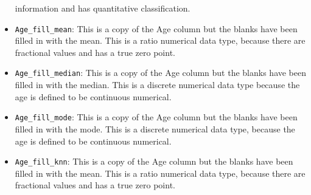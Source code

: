 \documentclass[a4paper, twocolumn]{article}
\begin{document}
\begin{itemize}
    information and has quantitative classification.
    \item \texttt{Age\_fill\_mean}: This is a copy of the Age column
    but the blanks have been filled in with the mean.
    This is a ratio numerical data type, because there are 
    fractional values and has a true zero point.
    \item \texttt{Age\_fill\_median}: This is a copy of the Age
    column but the blanks have been filled in with the median.
    This is a discrete numerical data type because the age is 
    defined to be continuous numerical.
    \item \texttt{Age\_fill\_mode}: This is a copy of the Age column
    but the blanks have been filled in with the mode.
    This is a discrete numerical data type, because the age is 
    defined to be continuous numerical.
    \item \texttt{Age\_fill\_knn}: This is a copy of the Age column
    but the blanks have been filled in with the mean.
    This is a ratio numerical data type, because there are 
    fractional values and has a true zero point.
\end{itemize}
\end{document}
